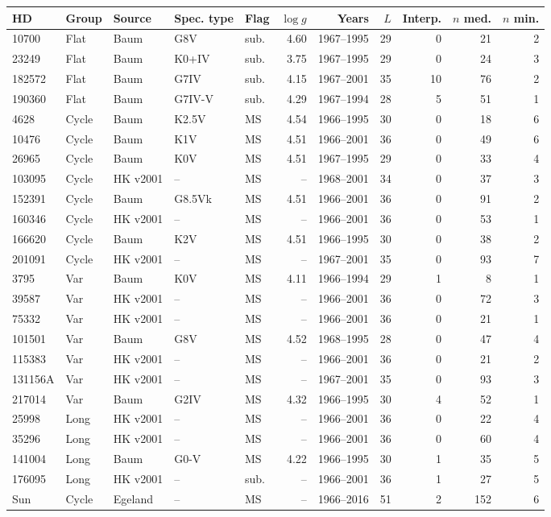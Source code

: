 \begin{tabular}{lllllrrrrrr}
\hline
HD & Group & Source & Spec. type & Flag & $\log g$ & Years & $L$ & Interp. & $n$ med. & $n$ min. \\
\hline
10700 & Flat & Baum & G8V & sub. & 4.60 & 1967--1995 & 29 & 0 & 21 & 2 \\
23249 & Flat & Baum & K0+IV & sub. & 3.75 & 1967--1995 & 29 & 0 & 24 & 3 \\
182572 & Flat & Baum & G7IV & sub. & 4.15 & 1967--2001 & 35 & 10 & 76 & 2 \\
190360 & Flat & Baum & G7IV-V & sub. & 4.29 & 1967--1994 & 28 & 5 & 51 & 1 \\
4628 & Cycle & Baum & K2.5V & MS & 4.54 & 1966--1995 & 30 & 0 & 18 & 6 \\
10476 & Cycle & Baum & K1V & MS & 4.51 & 1966--2001 & 36 & 0 & 49 & 6 \\
26965 & Cycle & Baum & K0V & MS & 4.51 & 1967--1995 & 29 & 0 & 33 & 4 \\
103095 & Cycle & HK v2001 & -- & MS & -- & 1968--2001 & 34 & 0 & 37 & 3 \\
152391 & Cycle & Baum & G8.5Vk & MS & 4.51 & 1966--2001 & 36 & 0 & 91 & 2 \\
160346 & Cycle & HK v2001 & -- & MS & -- & 1966--2001 & 36 & 0 & 53 & 1 \\
166620 & Cycle & Baum & K2V & MS & 4.51 & 1966--1995 & 30 & 0 & 38 & 2 \\
201091 & Cycle & HK v2001 & -- & MS & -- & 1967--2001 & 35 & 0 & 93 & 7 \\
3795 & Var & Baum & K0V & MS & 4.11 & 1966--1994 & 29 & 1 & 8 & 1 \\
39587 & Var & HK v2001 & -- & MS & -- & 1966--2001 & 36 & 0 & 72 & 3 \\
75332 & Var & HK v2001 & -- & MS & -- & 1966--2001 & 36 & 0 & 21 & 1 \\
101501 & Var & Baum & G8V & MS & 4.52 & 1968--1995 & 28 & 0 & 47 & 4 \\
115383 & Var & HK v2001 & -- & MS & -- & 1966--2001 & 36 & 0 & 21 & 2 \\
131156A & Var & HK v2001 & -- & MS & -- & 1967--2001 & 35 & 0 & 93 & 3 \\
217014 & Var & Baum & G2IV & MS & 4.32 & 1966--1995 & 30 & 4 & 52 & 1 \\
25998 & Long & HK v2001 & -- & MS & -- & 1966--2001 & 36 & 0 & 22 & 4 \\
35296 & Long & HK v2001 & -- & MS & -- & 1966--2001 & 36 & 0 & 60 & 4 \\
141004 & Long & Baum & G0-V & MS & 4.22 & 1966--1995 & 30 & 1 & 35 & 5 \\
176095 & Long & HK v2001 & -- & sub. & -- & 1966--2001 & 36 & 1 & 27 & 5 \\
Sun & Cycle & Egeland & -- & MS & -- & 1966--2016 & 51 & 2 & 152 & 6 \\
\hline
\end{tabular}
